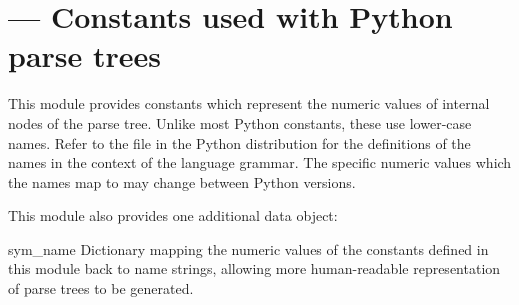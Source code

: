 \section{ ---
         Constants used with Python parse trees}



This module provides constants which represent the numeric values of
internal nodes of the parse tree.  Unlike most Python constants, these
use lower-case names.  Refer to the file  in the
Python distribution for the definitions of the names in the context of
the language grammar.  The specific numeric values which the names map
to may change between Python versions.

This module also provides one additional data object:


\begin{datadesc}{sym_name}
  Dictionary mapping the numeric values of the constants defined in
  this module back to name strings, allowing more human-readable
  representation of parse trees to be generated.
\end{datadesc}


\begin{seealso}
\end{seealso}
